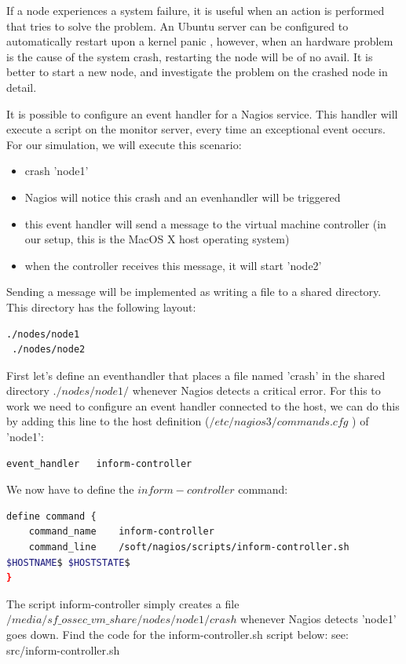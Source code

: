 \documentclass[12pt]{report}
\begin{document}
If a node experiences a system failure, it is useful when an action is
performed that tries to solve the problem. An Ubuntu server can be
configured to automatically restart upon a kernel panic
\cite{restart_upon_kernel_panic}, however, when an hardware problem is
the cause of the system crash, restarting the node will be of no
avail. It is better to start a new node, and investigate the problem
on the crashed node in detail.

It is possible to configure an event handler for a Nagios
service. This handler will execute a script on the monitor
server, every time an exceptional event occurs.
For our simulation, we will execute this scenario:
\begin{itemize}
\item crash 'node1'
\item Nagios will notice this crash and an evenhandler will be
  triggered
\item this event handler will send a message to the virtual machine
  controller (in our setup, this is the MacOS X host operating
  system)
\item when the controller receives this message, it will start 'node2'
\end{itemize}
Sending a message will be implemented as writing a file to a shared
directory. This directory has the following layout:
\begin{lstlisting}[language=bash]
 ./nodes/node1
 ./nodes/node2
\end{lstlisting} 
First let's define an eventhandler that places a file named 'crash' in the
shared directory $./nodes/node1/$ whenever Nagios detects a critical
error.
For this to work we need to configure an event handler connected to
the host, we can do this by adding this line to the host definition ($/etc/nagios3/commands.cfg$ ) of 'node1':
\begin{lstlisting}[language=bash]
event_handler   inform-controller
\end{lstlisting} 
We now have to define the $inform-controller$ command:
\begin{lstlisting}[language=bash]
define command {
    command_name    inform-controller
    command_line    /soft/nagios/scripts/inform-controller.sh
$HOSTNAME$ $HOSTSTATE$
}
\end{lstlisting} 
The script inform-controller simply creates a file
$/media/sf\_ossec\_vm\_share/nodes/node1/crash$ whenever Nagios
detects 'node1' goes down.
Find the code for the inform-controller.sh script below:
see: src/inform-controller.sh
\end{document}

